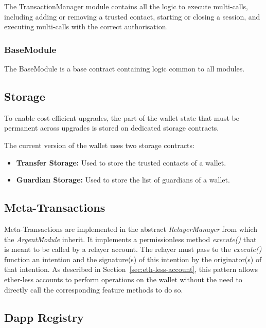 \documentclass[12pt]{article}
\begin{document}
The TransactionManager module contains all the logic to execute multi-calls, including adding or removing a trusted contact, starting or closing a session, and executing multi-calls with the correct authorisation. 

\subsubsection{BaseModule}

The BaseModule is a base contract containing logic common to all modules.

\subsection{Storage}
\label{sec:storage}
To enable cost-efficient upgrades, the part of the wallet state that must be permanent across upgrades is stored on dedicated storage contracts. 

The current version of the wallet uses two storage contracts:
\begin{itemize}
    \item \textbf{Transfer Storage:} Used to store the trusted contacts of a wallet.
    \item \textbf{Guardian Storage:} Used to store the list of guardians of a wallet.
\end{itemize}

\subsection{Meta-Transactions}
\label{sec:meta-transactions}
Meta-Transactions are implemented in the abstract \emph{RelayerManager} from which the \emph{ArgentModule} inherit. It implements a permissionless method \emph{execute()} that is meant to be called by a relayer account. The relayer must pass to the \emph{execute()} function an intention and the signature(s) of this intention by the originator(s) of that intention. As described in Section~\ref{sec:eth-less-account}, this pattern allows ether-less accounts to perform operations on the wallet without the need to directly call the corresponding feature methods to do so.

\subsection{Dapp Registry}
\end{document}
